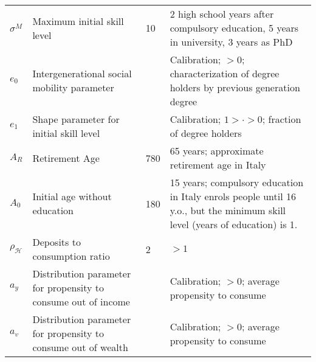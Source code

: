 \documentclass[a4paper, headings=standardclasses]{scrartcl}
\numberwithin{equation}{subsection}
\begin{document}
\begin{xltabular}{\linewidth}{lXlX}
    $\sigma^M$                   & Maximum initial skill level                                  & 10    & 2 high school years after compulsory education, 5 years in university, 3 years as PhD                                                                                                                                                         \\
    $e_0$                        & Intergenerational social mobility parameter                  &       & Calibration; $>0$; characterization of degree holders by previous generation degree                                                                                                                                                          \\
    $e_1$                        & Shape parameter for initial skill level                      &      & Calibration; $1> \cdot >0$; fraction of degree holders                                                                                                                                                           \\
    $A_R$                        & Retirement Age                                               & 780   & 65 years; approximate retirement age in Italy                                                                                                                                                         \\
    $A_0$                        & Initial age without education                                & 180   & 15 years; compulsory education in Italy enrols people until 16 y.o., but the minimum skill level (years of education) is 1.                                                                                                                                                            \\
    $\rho_\mathcal{H}$           & Deposits to consumption ratio                                &   2    & $>1$                                                                                                                                                         \\
    $a_y$                          & Distribution parameter for propensity to consume out of income     &       & Calibration; $>0$; average propensity to consume                                                                                                                                                          \\
    $a_v$                          & Distribution parameter for propensity to consume out of wealth   &       & Calibration; $>0$; average propensity to consume                                                                                                                                                          \\

\end{xltabular}
\end{document}
